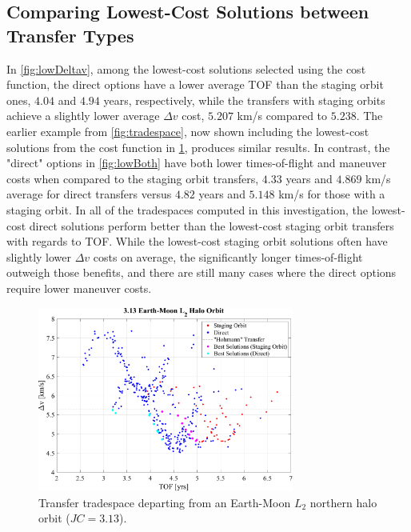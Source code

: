 \subsection{Comparing Lowest-Cost Solutions between Transfer Types}
In \cref{fig:lowDeltav}, among the lowest-cost solutions selected using the cost function, the
direct options have a lower average TOF than the staging orbit ones, $4.04$ and $4.94$ years,
respectively, while the transfers with staging orbits achieve a slightly lower average $\Delta v$
cost, $5.207$ km/s compared to $5.238$. The earlier example from \cref{fig:tradespace}, now shown
including the lowest-cost solutions from the cost function in \cref{fig:costTradespace}, produces
similar results. In contrast, the "direct" options in \cref{fig:lowBoth} have both lower
times-of-flight and maneuver costs when compared to the staging orbit transfers, $4.33$ years and
$4.869$ km/s average for direct transfers versus $4.82$ years and $5.148$ km/s for those with a
staging orbit. In all of the tradespaces computed in this investigation, the lowest-cost direct
solutions perform better than the lowest-cost staging orbit transfers with regards to TOF. While
the lowest-cost staging orbit solutions often have slightly lower $\Delta v$ costs on average, the
significantly longer times-of-flight outweigh those benefits, and there are still many cases where
the direct options require lower maneuver costs.

\begin{figure}[ht]
    \centering
    \includegraphics[width=0.75\textwidth]{figures/TradeSpace_L2Halo_3_13.pdf}
    \caption{Transfer tradespace departing from an Earth-Moon $L_{2}$ northern halo orbit ($JC=3.13$).}
    \label{fig:costTradespace}
\end{figure}

